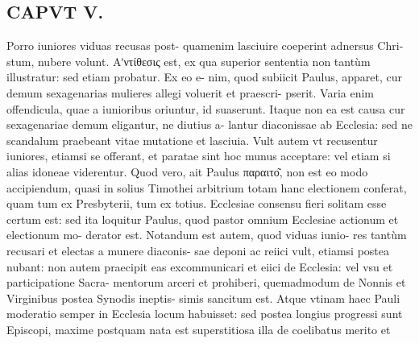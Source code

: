 \documentclass{article}
\begin{document}
\begin{pages}
\section*{CAPVT  V. }
\marginpar{[ p.281 ]} Porro iuniores viduas recusas post- quamenim lasciuire coeperint adnersus Chri- stum, nubere volunt.  \pend\pstart Αʹντίθεσις est, ex qua superior sententia non tantùm illustratur: sed etiam probatur. Ex eo e- nim, quod subiicit Paulus, apparet, cur demum sexagenarias mulieres allegi voluerit et praescri- pserit. Varia enim offendicula, quae a iunioribus oriuntur, id suaserunt. Itaque non ea est causa cur sexagenariae demum eligantur, ne diutius a- lantur diaconissae ab Ecclesia: sed ne scandalum praebeant vitae mutatione et lasciuia.  \pend\pstart Vult autem vt recusentur iuniores, etiamsi se offerant, et paratae sint hoc munus acceptare: vel etiam si alias idoneae viderentur. Quod vero, ait Paulus παραιτο͂, non est eo modo accipiendum, quasi in solius Timothei arbitrium totam hanc electionem conferat, quam tum ex Presbyterii, tum ex totius. Ecclesiae consensu fieri solitam esse certum est: sed ita loquitur Paulus, quod pastor omnium Ecclesiae actionum et electionum mo- derator est. Notandum est autem, quod viduas iunio- res tantùm recusari et electas a munere diaconis- sae deponi ac reiici vult, etiamsi postea nubant: non autem praecipit eas excommunicari et eiici de Ecclesia: vel vsu et participatione Sacra- mentorum arceri et prohiberi, quemadmodum de Nonnis et Virginibus postea Synodis ineptis- simis sancitum est. Atque  vtinam haec Pauli moderatio semper in Ecclesia locum habuisset: sed postea longius progressi sunt Episcopi, maxime postquam nata est superstitiosa illa de coelibatus merito et  \pend

\end{pages}
\end{document}
